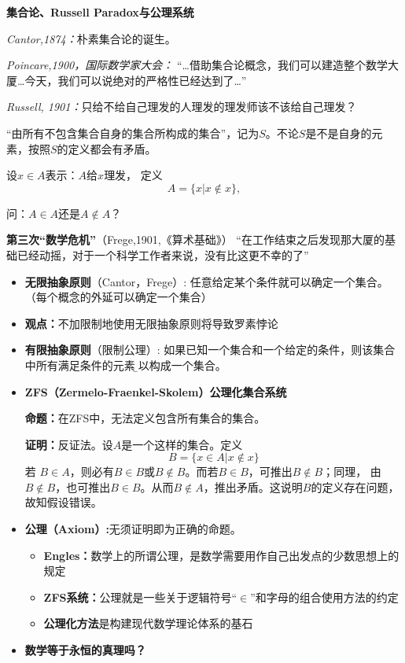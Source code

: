 \begin{shaded}

{\bf 集合论、Russell Paradox与公理系统}

	{\it Cantor,1874：}朴素集合论的诞生。	

	{\it Poincare,1900，国际数学家大会：} 
		 {“\ldots 借助集合论概念，我们可以建造整个数学大厦\ldots  今天，我们可以说绝对的严格性已经达到了\ldots”}
	
	{\it Russell, 1901：}只给不给自己理发的人理发的理发师该不该给自己理发？
	
	“由所有不包含集合自身的集合所构成的集合”，记为$S$。不论$S$是不是自身的元素，按照$S$的定义都会有矛盾。
	
	设$x\in A$表示：$A$给$x$理发， 定义
	$$A=\{x|x\notin x\},$$ 
	
	问：$A\in A$还是$A\notin A$？ 
	
	{{\bf {第三次“数学危机”}}（Frege,1901,《算术基础》）}
		“在工作结束之后发现那大厦的基础已经动摇，对于一个科学工作者来说，没有比这更不幸的了”
		
	\begin{itemize}
	  \item {{\bf 无限抽象原则}（Cantor，Frege）:} 任意给定某个条件就可以确定一个集合。（每个概念的外延可以确定一个集合）
	  \item {\bf 观点：}不加限制地使用无限抽象原则将导致罗素悖论
	  \item {{\bf 有限抽象原则}（限制公理）:} 如果已知一个集合和一个给定的条件，则该集合中所有满足条件的元素{\b 可以}构成一个集合。
	  \item {\bf ZFS（Zermelo-Fraenkel-Skolem）公理化集合系统}
	  
	  {\bf 命题：}在ZFS中，无法定义包含所有集合的集合。
	
	{\bf 证明：}反证法。设$A$是一个这样的集合。定义
	$$B=\{x\in A|x\notin x\}$$
	若
	$B\in A$，则必有$B\in B$或$B\notin B$。而若$B\in B$，可推出$B\notin B$；同理，
	由$B\notin B$，也可推出$B\in B$。从而$B\notin A$，推出矛盾。这说明$B$的定义存在问题，故知假设错误。

	\item {\bf 公理（Axiom）:}无须证明即为正确的命题。
	\begin{itemize}
	  \item {\bf Engles：}数学上的所谓公理，是数学需要用作自己出发点的少数思想上的规定 
	  \item {\bf ZFS系统：}公理就是一些关于逻辑符号{“$\in$”}和{字母}的组合使用方法的约定
	  \item {\bf 公理化方法}是构建现代数学理论体系的基石
	\end{itemize}
	\item {\bf {数学等于永恒的真理吗？}}
	\end{itemize}
\end{shaded}
	
